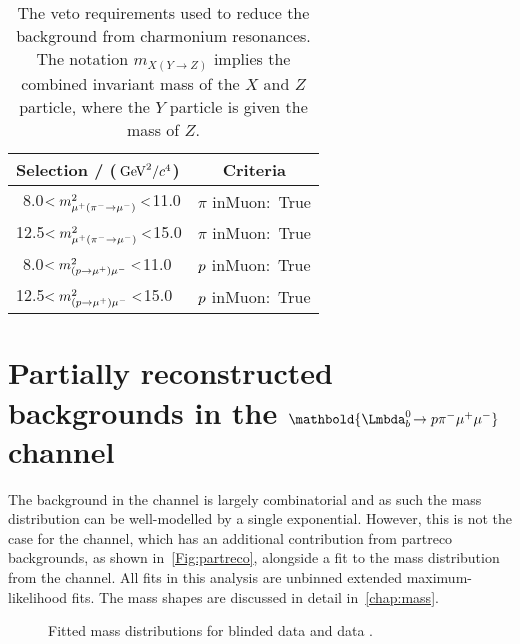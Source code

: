 \begin{table}
  \centering
  \begin{tabular}{ l | c }
    \hline
    Selection / ($\mathrm{\,Ge\kern -0.1em V}^{2}/c^{4}$) & Criteria \\
    \hline
    $\;\,$8.0$<m^{2}_{{\mu^+}({{\pi}^-}\rightarrow{\ensuremath{\mu^-}})}<$11.0 & $\pi$ inMuon$:$ True\\
    12.5$<m^{2}_{{\mu^+}({{\pi}^-}\rightarrow{\ensuremath{\mu^-}})}<$15.0 & $\pi$ inMuon$:$ True\\
    $\;\,$8.0$<m^{2}_{({p}\rightarrow{\ensuremath{\mu^+}}){\mu^-}}<$11.0 & ${p}$ inMuon$:$ True\\
    12.5$<m^{2}_{({p}\rightarrow{\ensuremath{\mu^+}}){\mu^-}}<$15.0 & ${p}$ inMuon$:$ True\\

    \hline
  \end{tabular}
  \caption{The veto requirements used to reduce the background from charmonium resonances. The notation $m_{X(Y\to Z)}$ implies the combined invariant mass of the $X$ and $Z$ particle, where the $Y$ particle is given the mass of $Z$.}
  \label{tab:muon}
\end{table}
\section[Partially reconstructed backgrounds in the $\Lbpi$ channel]{Partially reconstructed backgrounds in the $\mathbold{\Lbpi}$ channel}
\label{Sec:partreco}
The background in the \Lbpijpsi channel is largely combinatorial and as such the \Lbpijpsi mass distribution can be well-modelled by a single exponential. However, this is not the case for the \Lbpi channel, which has an additional contribution from \gls{partreco} backgrounds, as shown in~\autoref{Fig:partreco}, alongside a fit to the mass distribution from the \LbK channel. All fits in this analysis are unbinned extended maximum-likelihood fits. The mass shapes are discussed in detail in~\autoref{chap:mass}.
\begin{figure}[!ht]\def\nh{0.3\textwidth}
  \centering
    \caption{Fitted mass distributions for blinded \Lbpi data \protect{} and \LbK data \protect{}. }
  \label{Fig:partreco}
\end{figure}



